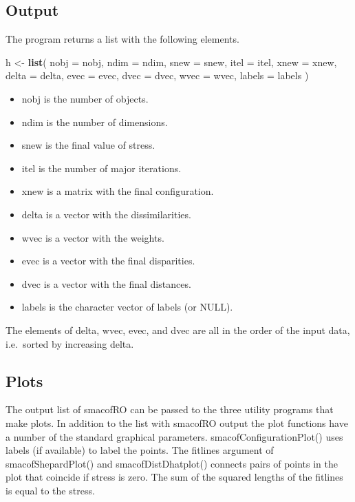 \documentclass[
  12pt,
]{article}
\newenvironment{Shaded}{\begin{snugshade}}{\end{snugshade}}
\newcommand{\AttributeTok}[1]{\textcolor[rgb]{0.13,0.29,0.53}{#1}}
\newcommand{\FunctionTok}[1]{\textcolor[rgb]{0.13,0.29,0.53}{\textbf{#1}}}
\newcommand{\NormalTok}[1]{#1}
\newcommand{\OtherTok}[1]{\textcolor[rgb]{0.56,0.35,0.01}{#1}}
\providecommand{\tightlist}{%
  \setlength{\itemsep}{0pt}\setlength{\parskip}{0pt}}
\begin{document}
\subsection{Output}\label{output}

The program returns a list with the following elements.

\begin{Shaded}
\begin{Highlighting}[]
\NormalTok{  h }\OtherTok{\textless{}{-}} \FunctionTok{list}\NormalTok{(}
    \AttributeTok{nobj =}\NormalTok{ nobj,}
    \AttributeTok{ndim =}\NormalTok{ ndim,}
    \AttributeTok{snew =}\NormalTok{ snew,}
    \AttributeTok{itel =}\NormalTok{ itel,}
    \AttributeTok{xnew =}\NormalTok{ xnew,}
    \AttributeTok{delta =}\NormalTok{ delta,}
    \AttributeTok{evec =}\NormalTok{ evec,}
    \AttributeTok{dvec =}\NormalTok{ dvec,}
    \AttributeTok{wvec =}\NormalTok{ wvec,}
    \AttributeTok{labels =}\NormalTok{ labels}
\NormalTok{  )}
\end{Highlighting}
\end{Shaded}

\begin{itemize}
\tightlist
\item
  nobj is the number of objects.
\item
  ndim is the number of dimensions.
\item
  snew is the final value of stress.
\item
  itel is the number of major iterations.
\item
  xnew is a matrix with the final configuration.
\item
  delta is a vector with the dissimilarities.
\item
  wvec is a vector with the weights.
\item
  evec is a vector with the final disparities.
\item
  dvec is a vector with the final distances.
\item
  labels is the character vector of labels (or NULL).
\end{itemize}

The elements of delta, wvec, evec, and dvec are all in the order of the
input data, i.e.~sorted by increasing delta.

\subsection{Plots}\label{plots}

The output list of smacofRO can be passed to the three utility programs that make plots.
In addition to the list with smacofRO output the plot functions have a number of the
standard graphical parameters. smacofConfigurationPlot() uses labels (if available) to label the
points. The fitlines argument of smacofShepardPlot() and smacofDistDhatplot()
connects pairs of points in the plot that coincide if stress is zero. The sum of the squared lengths
of the fitlines is equal to the stress.
\end{document}

